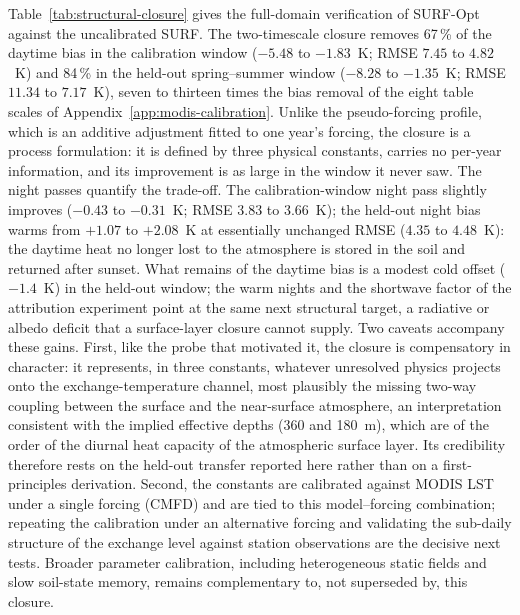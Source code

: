Table~\ref{tab:structural-closure} gives the full-domain verification of
SURF-Opt against the uncalibrated SURF. The two-timescale closure removes
67\,\% of the daytime bias in the calibration window ($-5.48$ to $-1.83$~K;
RMSE $7.45$ to $4.82$~K) and 84\,\% in the held-out spring--summer window
($-8.28$ to $-1.35$~K; RMSE $11.34$ to $7.17$~K), seven to thirteen times
the bias removal of the eight table scales of
Appendix~\ref{app:modis-calibration}. Unlike the pseudo-forcing profile,
which is an additive adjustment fitted to one year's forcing, the closure is
a process formulation: it is defined by three physical constants, carries no
per-year information, and its improvement is as large in the window
it never saw. The night passes quantify the trade-off. The
calibration-window night pass slightly improves ($-0.43$ to $-0.31$~K;
RMSE $3.83$ to $3.66$~K); the held-out night bias warms from $+1.07$ to
$+2.08$~K at essentially unchanged RMSE ($4.35$ to $4.48$~K): the daytime
heat no longer lost to the atmosphere is stored in the soil and returned
after sunset. What remains of the daytime bias is a modest cold offset
($-1.4$~K) in the held-out window; the warm nights and the shortwave
factor of the attribution experiment point at the same next structural
target, a radiative or albedo deficit that a surface-layer closure
cannot supply. Two caveats accompany these gains. First, like the probe
that motivated it, the closure is compensatory in character: it represents,
in three constants, whatever unresolved physics projects onto the
exchange-temperature channel, most plausibly the missing two-way coupling
between the surface and the near-surface atmosphere, an interpretation
consistent with the implied effective depths (360 and 180~m), which are of
the order of the diurnal heat capacity of the atmospheric surface layer.
Its credibility therefore rests on the held-out transfer reported here
rather than on a first-principles derivation. Second, the constants are
calibrated against MODIS LST under a single forcing (CMFD) and are tied to
this model--forcing combination; repeating the calibration under an
alternative forcing and validating the sub-daily structure of the exchange
level against station observations are the decisive next tests. Broader
parameter calibration, including heterogeneous static fields and slow
soil-state memory, remains complementary to, not superseded by, this
closure.

